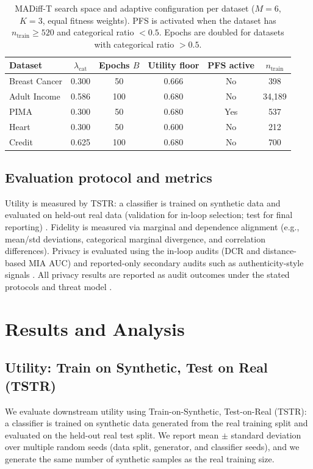 \documentclass[preprint,12pt]{elsarticle}
\begin{document}
\begin{table}[t]
\centering
\caption{MADiff-T search space and adaptive configuration per dataset ($M=6$, $K=3$, equal fitness weights). PFS is activated when the dataset has $n_{\text{train}} \geq 520$ and categorical ratio $< 0.5$. Epochs are doubled for datasets with categorical ratio $> 0.5$.}
\label{tab:madifft_hparams}
\scriptsize
\setlength{\tabcolsep}{4pt}
\renewcommand{\arraystretch}{1.1}
\begin{tabular}{l c c c c c}
\toprule
\rowcolor{tablehead}
\textbf{Dataset} & \textbf{$\lambda_{\text{cat}}$} & \textbf{Epochs $B$} & \textbf{Utility floor} & \textbf{PFS active} & \textbf{$n_{\text{train}}$} \\
\midrule
Breast Cancer & 0.300 & 50  & 0.666 & No  & 398 \\
Adult Income  & 0.586 & 100 & 0.680 & No  & 34{,}189 \\
PIMA          & 0.300 & 50  & 0.680 & Yes & 537 \\
Heart         & 0.300 & 50  & 0.600 & No  & 212 \\
Credit        & 0.625 & 100 & 0.680 & No  & 700 \\
\bottomrule
\end{tabular}
\end{table}


\subsection{Evaluation protocol and metrics}
Utility is measured by TSTR: a classifier is trained on synthetic data and evaluated on held-out real data (validation for in-loop selection; test for final reporting) \cite{Jia2024}. Fidelity is measured via marginal and dependence alignment (e.g., mean/std deviations, categorical marginal divergence, and correlation differences). Privacy is evaluated using the in-loop audits (DCR and distance-based MIA AUC) and reported-only secondary audits such as authenticity-style signals \cite{Alaa2022,lautrup2025syntheval}. All privacy results are reported as audit outcomes under the stated protocols and threat model \cite{Hernandez2025,Hyrup2025}.

\section{Results and Analysis}\label{sec:results}

\subsection{Utility: Train on Synthetic, Test on Real (TSTR)}\label{sec:results_utility}
We evaluate downstream utility using Train-on-Synthetic, Test-on-Real (TSTR): a classifier is trained on synthetic data generated from the real training split and evaluated on the held-out real test split. We report mean $\pm$ standard deviation over multiple random seeds (data split, generator, and classifier seeds), and we generate the same number of synthetic samples as the real training size.
\end{document}
